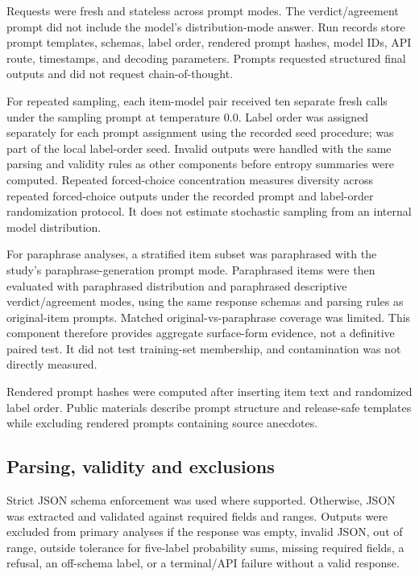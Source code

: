 \documentclass[11pt]{article}
\begin{document}
Requests were fresh and stateless across prompt modes. The verdict/agreement prompt did not include the model's distribution-mode answer. Run records store prompt templates, schemas, label order, rendered prompt hashes, model IDs, API route, timestamps, and decoding parameters. Prompts requested structured final outputs and did not request chain-of-thought.

For repeated sampling, each item-model pair received ten separate fresh calls under the sampling prompt at temperature 0.0. Label order was assigned separately for each prompt assignment using the recorded seed procedure;  was part of the local label-order seed. Invalid outputs were handled with the same parsing and validity rules as other components before entropy summaries were computed. Repeated forced-choice concentration measures diversity across repeated forced-choice outputs under the recorded prompt and label-order randomization protocol. It does not estimate stochastic sampling from an internal model distribution.

For paraphrase analyses, a stratified item subset was paraphrased with the study's paraphrase-generation prompt mode. Paraphrased items were then evaluated with paraphrased distribution and paraphrased descriptive verdict/agreement modes, using the same response schemas and parsing rules as original-item prompts. Matched original-vs-paraphrase coverage was limited. This component therefore provides aggregate surface-form evidence, not a definitive paired test. It did not test training-set membership, and contamination was not directly measured.

Rendered prompt hashes were computed after inserting item text and randomized label order. Public materials describe prompt structure and release-safe templates while excluding rendered prompts containing source anecdotes.

\subsection{Parsing, validity and exclusions}

Strict JSON schema enforcement was used where supported. Otherwise, JSON was extracted and validated against required fields and ranges. Outputs were excluded from primary analyses if the response was empty, invalid JSON, out of range, outside tolerance for five-label probability sums, missing required fields, a refusal, an off-schema label, or a terminal/API failure without a valid response.
\end{document}
